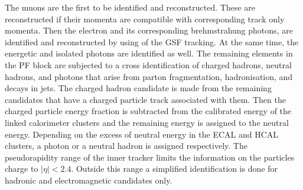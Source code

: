  The muons are the first to be identified and reconstructed. These are reconstructed if their momenta are compatible with corresponding track only momenta. Then the electron and its corresponding brehmstrahung photons, are identified and reconstructed by using of the GSF tracking. At the same time, the energetic and isolated photons are identified as well. The remaining elements in the PF block are subjected to a cross identification of charged hadrons, neutral hadrons, and photons that arise from parton fragmentation, hadronisation, and decays in jets. The charged hadron candidate is made from the remaining candidates that have a charged particle track associated with them. Then the charged particle energy fraction is subtracted from the calibrated energy of the linked calorimeter clusters and the remaining energy is assigned to the neutral energy. Depending on the excess of neutral energy in the ECAL and HCAL clusters, a photon or a neutral hadron is assigned respectively. The pseudorapidity range of the inner tracker limits the information on the particles charge to $|\eta| < 2.4$. Outside this range a simplified identification is done for hadronic and electromagnetic candidates only. 

